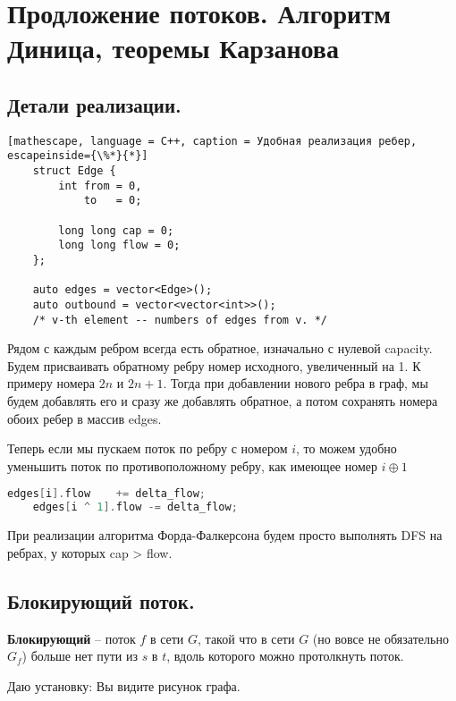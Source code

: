 \section{Продложение потоков. Алгоритм Диница, теоремы Карзанова}%
\label{sec:Продложение потоков. Алгоритм Диница, теоремы Карзанова}

\subsection{Детали реализации.}%
\label{sub:Детали реализации.}


\begin{lstlisting}[mathescape, language = C++, caption = Удобная реализация ребер, escapeinside={\%*}{*}] 
	struct Edge {
		int from = 0,
		    to   = 0;

		long long cap = 0;
		long long flow = 0;
	};

	auto edges = vector<Edge>();
	auto outbound = vector<vector<int>>(); 
	/* v-th element -- numbers of edges from v. */
\end{lstlisting}

Рядом с каждым ребром всегда есть обратное, изначально с нулевой capacity. Будем присваивать обратному ребру номер исходного, увеличенный на 1. К примеру номера $2n$ и $2n + 1$.
Тогда при добавлении нового ребра в граф, мы будем добавлять его и сразу же добавлять обратное, а потом сохранять номера обоих ребер в массив edges.

Теперь если мы пускаем поток по ребру с номером $i$, то можем удобно уменьшить поток по противоположному ребру, как имеющее номер $i \oplus 1$

\begin{lstlisting}[language = C++]
	edges[i].flow	 += delta_flow;
	edges[i ^ 1].flow -= delta_flow;
\end{lstlisting}
При реализации алгоритма Форда-Фалкерсона будем просто выполнять DFS на ребрах, у которых cap > flow.

\subsection{Блокирующий поток.}%

\begin{Def}
	\textbf{Блокирующий} --  поток $f$ в сети  $G$, такой что в сети  $G$ (но вовсе не обязательно $G_f$) больше нет пути из $s$ в  $t$, вдоль которого можно протолкнуть поток. 
\end{Def}
\begin{example}
	Даю установку: Вы видите рисунок графа.
\end{example}

